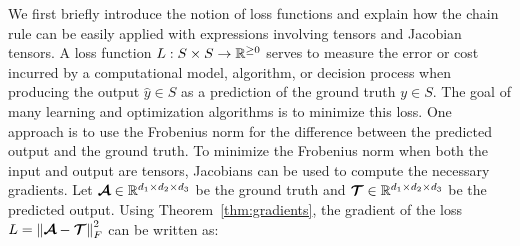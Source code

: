 We first briefly introduce the notion of loss functions and explain how the chain rule can be easily applied with expressions involving tensors and Jacobian tensors. A loss function $L:S\times S\to \mathbb{R}^{\geq 0}$ serves to measure the error or cost incurred by a computational model, algorithm, or decision process when producing the output $\hat{y}\in S$ as a prediction of the ground truth $y\in S$. The goal of many learning and optimization algorithms is to minimize this loss. One approach is to use the Frobenius norm for the difference between the predicted output and the ground truth. To minimize the Frobenius norm when both the input and output are tensors, Jacobians can be used to compute the necessary gradients. Let $\bm{\mathcal{A}}\in\mathbb{R}^{d_1\times d_2\times d_3}$ be the ground truth and $\bm{\mathcal{T}}\in\mathbb{R}^{d_1\times d_2\times d_3}$ be the predicted output. Using Theorem~\ref{thm:gradients}, the gradient of the loss $L = \left\lVert\bm{\mathcal{A}}-\bm{\mathcal{T}}\right\rVert_F^2$ can be written as:
